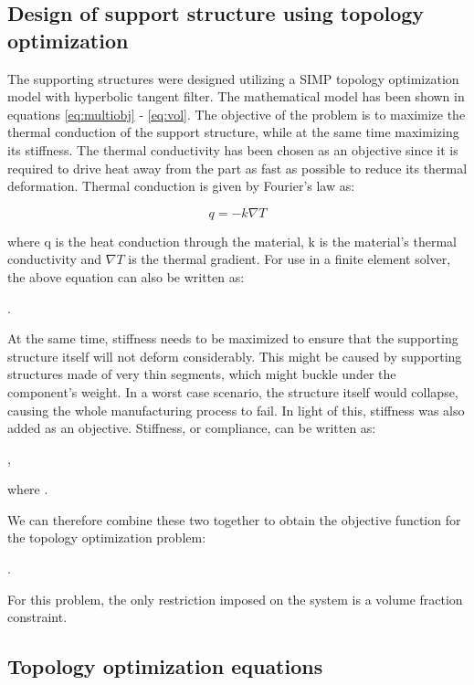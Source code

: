\documentclass[../main.tex]{subfiles}
\begin{document}
\subsection{Design of support structure using topology optimization}

The supporting structures were designed utilizing a SIMP topology optimization model with hyperbolic tangent filter. The mathematical model has been shown in equations \ref{eq:multiobj} - \ref{eq:vol}. The objective of the problem is to maximize the thermal conduction of the support structure, while at the same time maximizing its stiffness. The thermal conductivity has been chosen as an objective since it is required to drive heat away from the part as fast as possible to reduce its thermal deformation. 
Thermal conduction is given by Fourier's law as:

\begin{equation}
  \label{eq:Fourier Law}
  q = -k \nabla T
\end{equation}

where q is the heat conduction through the material, k is the material's thermal conductivity and $\nabla T$ is the thermal gradient. For use in a finite element solver, the above equation can also be written as:

.

At the same time, stiffness needs to be maximized to ensure that the supporting structure itself will not deform considerably. This might be caused by supporting structures made of very thin segments, which might buckle under the component's weight. In a worst case scenario, the structure itself would collapse, causing the whole manufacturing process to fail. In light of this, stiffness was also added as an objective. Stiffness, or compliance, can be written as:

,

where .

We can therefore combine these two together to obtain the objective function for the topology optimization problem:

.

For this problem, the only restriction imposed on the system is a volume fraction constraint.

\subsection{Topology optimization equations}
\end{document}
